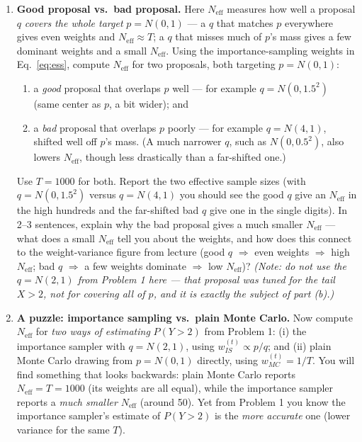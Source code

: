 \documentclass[11pt]{article}
\begin{document}
\begin{enumerate}
\begin{enumerate}
\item {\bf Good proposal vs.\ bad proposal.} Here $N_{\mathrm{eff}}$ measures how well a proposal $q$ {\em covers the whole target} $p = N(0,1)$ --- a $q$ that matches $p$ everywhere gives even weights and $N_{\mathrm{eff}} \approx T$; a $q$ that misses much of $p$'s mass gives a few dominant weights and a small $N_{\mathrm{eff}}$. Using the importance-sampling weights in Eq.~\eqref{eq:ess}, compute $N_{\mathrm{eff}}$ for two proposals, both targeting $p = N(0,1)$:
\begin{enumerate}
\item[(i)] a {\em good} proposal that overlaps $p$ well --- for example $q = N(0, 1.5^2)$ (same center as $p$, a bit wider); and
\item[(ii)] a {\em bad} proposal that overlaps $p$ poorly --- for example $q = N(4,1)$, shifted well off $p$'s mass. (A much narrower $q$, such as $N(0, 0.5^2)$, also lowers $N_{\mathrm{eff}}$, though less drastically than a far-shifted one.)
\end{enumerate}
Use $T = 1000$ for both. Report the two effective sample sizes (with $q=N(0,1.5^2)$ versus $q=N(4,1)$ you should see the good $q$ give an $N_{\mathrm{eff}}$ in the high hundreds and the far-shifted bad $q$ give one in the single digits). In 2--3 sentences, explain why the bad proposal gives a much smaller $N_{\mathrm{eff}}$ --- what does a small $N_{\mathrm{eff}}$ tell you about the weights, and how does this connect to the weight-variance figure from lecture (good $q$ $\Rightarrow$ even weights $\Rightarrow$ high $N_{\mathrm{eff}}$; bad $q$ $\Rightarrow$ a few weights dominate $\Rightarrow$ low $N_{\mathrm{eff}}$)? {\em (Note: do not use the $q=N(2,1)$ from Problem 1 here --- that proposal was tuned for the {\em tail} $X>2$, not for covering all of $p$, and it is exactly the subject of part (b).)}

\item {\bf A puzzle: importance sampling vs.\ plain Monte Carlo.} Now compute $N_{\mathrm{eff}}$ for {\em two ways of estimating} $P(Y>2)$ from Problem 1: (i) the importance sampler with $q=N(2,1)$, using $w_{IS}^{(t)} \propto p/q$; and (ii) plain Monte Carlo drawing from $p = N(0,1)$ directly, using $w_{MC}^{(t)} = 1/T$. You will find something that looks backwards: plain Monte Carlo reports $N_{\mathrm{eff}} = T = 1000$ (its weights are all equal), while the importance sampler reports a {\em much smaller} $N_{\mathrm{eff}}$ (around 50). Yet from Problem 1 you know the importance sampler's estimate of $P(Y>2)$ is the {\em more accurate} one (lower variance for the same $T$).


\end{enumerate}
\end{enumerate}
\end{document}
